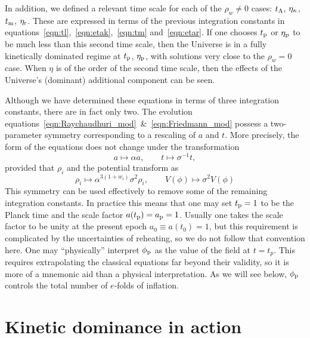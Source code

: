 In addition, we defined a relevant time scale for each of the $\rho_w \neq 0$ cases: $t_\mathrm{\Lambda}$, $\eta_\mathrm{\kappa}$, $t_{\mathrm{m}}$, $\eta_{\mathrm{r}}$. These are expressed in terms of the previous integration constants in equations~\eqref{eqn:tl},~\eqref{eqn:etak},~\eqref{eqn:tm} and~\eqref{eqn:etar}. If one chooses $t_{\mathrm{p}}$ or $\eta_{\mathrm{p}}$ to be much less than this second time scale, then the Universe is in a fully kinetically dominated regime at $t_{\mathrm{p}}$, $\eta_{\mathrm{p}}$, with solutions very close to the $\rho_w=0$ case. When $\eta$ is of the order of the second time scale, then the effects of the Universe's (dominant) additional component can be seen.

Although we have determined these equations in terms of three integration constants, there are in fact only two.  The evolution equations~\eqref{eqn:Raychaudhuri_mod}~\&~\eqref{eqn:Friedmann_mod} possess a two-parameter symmetry corresponding to a rescaling of $a$ and $t$. More precisely, the form of the equations does not change under the transformation
%
\begin{equation}
  a\mapsto\alpha a, 
  \qquad 
  t \mapsto\sigma^{-1}t,
\end{equation}
%
provided that $\rho_i$ and the potential transform as
%
\begin{equation}
  \rho_i \mapsto \alpha^{3(1+w_i)}\sigma^2\rho_i, 
  \qquad
  V(\phi) \mapsto \sigma^2 V(\phi)
\end{equation}
%
This symmetry can be used effectively to remove some of the remaining integration constants. In practice this means that one may set $t_{\mathrm{p}}=1$ to be the Planck time and the scale factor $a(t_{\mathrm{p}})=a_{\mathrm{p}}=1$. Usually one takes the scale factor to be unity at the present epoch $a_0\equiv a(t_0)=1$, but this requirement is complicated by the uncertainties of reheating, so we do not follow that convention here. One may ``physically'' interpret $\phi_{\mathrm{p}}$ as the value of the field at $t=t_p$.  This requires extrapolating the classical equations far beyond their validity, so it is more of a mnemonic aid than a physical interpretation.  As we will see below, $\phi_{\mathrm{p}}$ controls the total number of $e$-folds of inflation.













\section{Kinetic dominance in action}
\label{sec:Kinetic_dominance_in_action}

